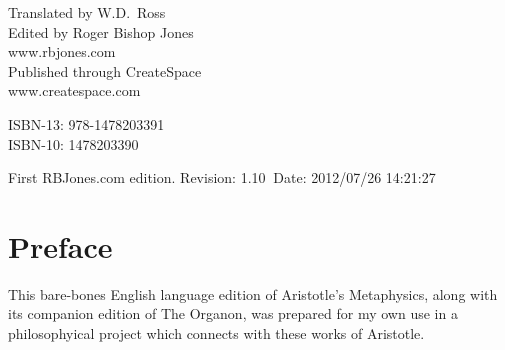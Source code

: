 \begin{titlepage}
\maketitle

\hspace{2in}

\vfill

\begin{centering}

Translated by W.D.~Ross\\
\vspace{0.2in}
Edited by Roger Bishop Jones\\
www.rbjones.com\\
\vspace{0.2in}
Published through CreateSpace\\
www.createspace.com\\
\vspace{0.2in}

ISBN-13: 978-1478203391\\
ISBN-10: 1478203390

\vspace{0.2in}

{\footnotesize

First RBJones.com edition. $ $Revision: 1.10 $~$Date: 2012/07/26 14:21:27 $ $

}%

\end{centering}

\thispagestyle{empty}
\end{titlepage}


{\parskip=0pt\tableofcontents}
\vfill

\pagebreak

\chapter*{Preface}

This bare-bones English language edition of Aristotle's Metaphysics, along with its companion edition of The Organon, was prepared for my own use in a philosophyical project which connects with these works of Aristotle.

